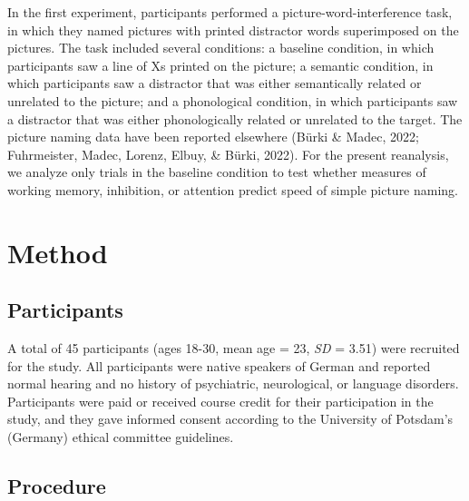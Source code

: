 \documentclass[
  man,floatsintext]{apa6}
\begin{document}
In the first experiment, participants performed a picture-word-interference task, in which they named pictures with printed distractor words superimposed on the pictures. The task included several conditions: a baseline condition, in which participants saw a line of Xs printed on the picture; a semantic condition, in which participants saw a distractor that was either semantically related or unrelated to the picture; and a phonological condition, in which participants saw a distractor that was either phonologically related or unrelated to the target. The picture naming data have been reported elsewhere (Bürki \& Madec, 2022; Fuhrmeister, Madec, Lorenz, Elbuy, \& Bürki, 2022). For the present reanalysis, we analyze only trials in the baseline condition to test whether measures of working memory, inhibition, or attention predict speed of simple picture naming.

\hypertarget{method}{%
\section{Method}\label{method}}

\hypertarget{participants}{%
\subsection{Participants}\label{participants}}

A total of 45 participants (ages 18-30, mean age = 23, \emph{SD} = 3.51) were recruited for the study. All participants were native speakers of German and reported normal hearing and no history of psychiatric, neurological, or language disorders. Participants were paid or received course credit for their participation in the study, and they gave informed consent according to the University of Potsdam's (Germany) ethical committee guidelines.

\hypertarget{procedure}{%
\subsection{Procedure}\label{procedure}}
\end{document}
